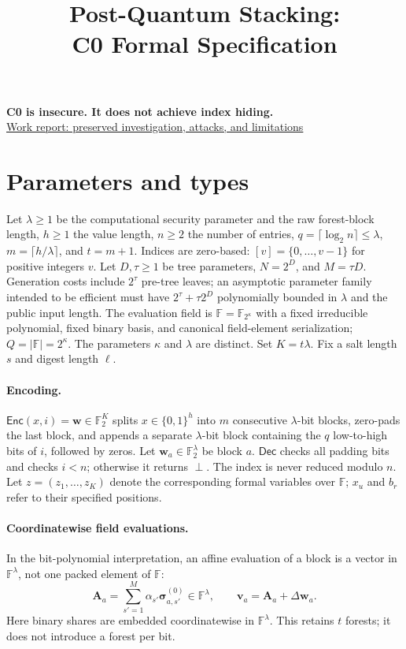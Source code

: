 \documentclass[11pt]{article}
\title{Post-Quantum Stacking:\\C0 Formal Specification}
\author{}
\date{}
\theoremstyle{plain}
\theoremstyle{definition}
\theoremstyle{remark}
\newcommand{\bits}{\{0,1\}}
\newcommand{\F}{\mathbb F}
\newcommand{\Ftwo}{\mathbb F_2}
\newcommand{\bad}{\perp}
\newcommand{\Enc}{\mathsf{Enc}}
\newcommand{\Dec}{\mathsf{Dec}}
\begin{document}
\maketitle
\begin{center}
\textbf{C0 is insecure. It does not achieve index hiding.}\\[3pt]
\href{https://github.com/j-schuldt/research-notes/blob/main/reports/Post-Quantum\%20Stacking/2026-10-24-c0-specification-and-investigation-cleanup.md}{Work report: preserved investigation, attacks, and limitations}
\end{center}

\section{Parameters and types}\label{sec:types}
Let $\lambda\geq1$ be the computational security parameter and the raw
forest-block length, $h\geq1$ the value length, $n\geq2$ the number of entries,
$q=\lceil\log_2 n\rceil\leq\lambda$, $m=\lceil h/\lambda\rceil$, and $t=m+1$.
Indices are zero-based: $[v]=\{0,\ldots,v-1\}$ for positive integers $v$.
Let $D,\tau\geq1$ be tree parameters, $N=2^D$, and $M=\tau D$.
Generation costs include $2^\tau$ pre-tree leaves; an asymptotic parameter
family intended to be efficient must have $2^\tau+\tau2^D$ polynomially
bounded in $\lambda$ and the public input length.
The evaluation field is $\F=\mathbb F_{2^\kappa}$ with a fixed irreducible
polynomial, fixed binary basis, and canonical field-element serialization;
$Q=|\F|=2^\kappa$. The parameters $\kappa$ and $\lambda$ are distinct.
Set $K=t\lambda$. Fix a salt length $s$ and digest length $\ell$.

\paragraph{Encoding.}
$\Enc(x,i)=\mathbf w\in\Ftwo^K$ splits $x\in\bits^h$ into $m$ consecutive
$\lambda$-bit blocks, zero-pads the last block, and appends a separate
$\lambda$-bit block containing the $q$ low-to-high bits of $i$, followed
by zeros. Let $\mathbf w_a\in\Ftwo^\lambda$ be block $a$.
$\Dec$ checks all padding bits and checks $i<n$; otherwise it returns
$\bad$. The index is never reduced modulo $n$.
Let $z=(z_1,\ldots,z_K)$ denote the corresponding formal variables over $\F$;
$x_u$ and $b_r$ refer to their specified positions.

\paragraph{Coordinatewise field evaluations.}
In the bit-polynomial interpretation, an affine evaluation of a block is a
vector in $\F^\lambda$, not one packed element of $\F$:
\begin{equation}\label{eq:typed}
 \mathbf A_a=\sum_{s'=1}^M\alpha_{s'}\boldsymbol\sigma^{(0)}_{a,s'}
 \in\F^\lambda,\qquad
 \mathbf v_a=\mathbf A_a+\Delta\mathbf w_a.
\end{equation}
Here binary shares are embedded coordinatewise in $\F^\lambda$.
This retains $t$ forests; it does not introduce a forest per bit.
\end{document}
